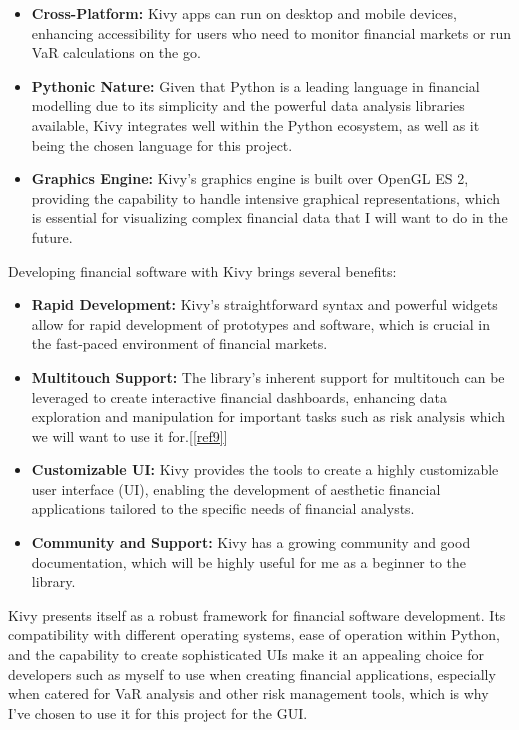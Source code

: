 \documentclass{article}
\begin{document}
\begin{itemize}
    \item \textbf{Cross-Platform:} Kivy apps can run on desktop and mobile devices, enhancing accessibility for users who need to monitor financial markets or run VaR calculations on the go.
    \item \textbf{Pythonic Nature:} Given that Python is a leading language in financial modelling due to its simplicity and the powerful data analysis libraries available, Kivy integrates well within the Python ecosystem, as well as it being the chosen language for this project.
    \item \textbf{Graphics Engine:} Kivy's graphics engine is built over OpenGL ES 2, providing the capability to handle intensive graphical representations, which is essential for visualizing complex financial data that I will want to do in the future.
\end{itemize}

Developing financial software with Kivy brings several benefits:

\begin{itemize}
    \item \textbf{Rapid Development:} Kivy's straightforward syntax and powerful widgets allow for rapid development of prototypes and software, which is crucial in the fast-paced environment of financial markets.
    
    \item \textbf{Multitouch Support:} The library's inherent support for multitouch can be leveraged to create interactive financial dashboards, enhancing data exploration and manipulation for important tasks such as risk analysis which we will want to use it for.[\ref{ref9}] 
    
    \item \textbf{Customizable UI:} Kivy provides the tools to create a highly customizable user interface (UI), enabling the development of aesthetic financial applications tailored to the specific needs of financial analysts.
    
    \item \textbf{Community and Support:} Kivy has a growing community and good documentation, which will be highly useful for me as a beginner to the library.
\end{itemize}

Kivy presents itself as a robust framework for financial software development. Its compatibility with different operating systems, ease of operation within Python, and the capability to create sophisticated UIs make it an appealing choice for developers such as myself to use when creating financial applications, especially when catered for VaR analysis and other risk management tools, which is why I've chosen to use it for this project for the GUI.\@
\end{document}
